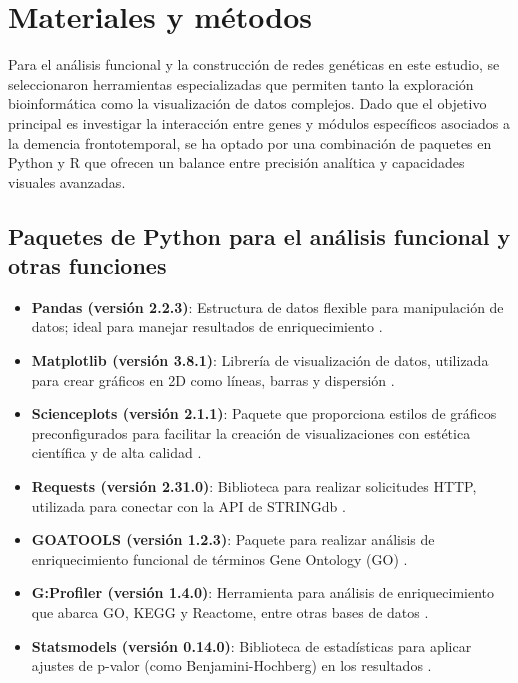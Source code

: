 \section{Materiales y métodos}
	
Para el análisis funcional y la construcción de redes genéticas en este estudio, se seleccionaron herramientas especializadas que permiten tanto la exploración bioinformática como la visualización de datos complejos. Dado que el objetivo principal es investigar la interacción entre genes y módulos específicos asociados a la demencia frontotemporal, se ha optado por una combinación de paquetes en Python y R que ofrecen un balance entre precisión analítica y capacidades visuales avanzadas.

\subsection*{Paquetes de Python para el análisis funcional y otras funciones}

\begin{itemize}
	\item \textbf{Pandas (versión 2.2.3)}: Estructura de datos flexible para manipulación de datos; ideal para manejar resultados de enriquecimiento \cite{pandas}.
	\item \textbf{Matplotlib (versión 3.8.1)}: Librería de visualización de datos, utilizada para crear gráficos en 2D como líneas, barras y dispersión \cite{matplotlib}.
	\item \textbf{Scienceplots (versión 2.1.1)}: Paquete que proporciona estilos de gráficos preconfigurados para facilitar la creación de visualizaciones con estética científica y de alta calidad \cite{scienceplots}.
	\item \textbf{Requests (versión 2.31.0)}: Biblioteca para realizar solicitudes HTTP, utilizada para conectar con la API de STRINGdb \cite{requests}.
	\item \textbf{GOATOOLS (versión 1.2.3)}: Paquete para realizar análisis de enriquecimiento funcional de términos Gene Ontology (GO) \cite{goatools}.
	\item \textbf{G:Profiler (versión 1.4.0)}: Herramienta para análisis de enriquecimiento que abarca GO, KEGG y Reactome, entre otras bases de datos \cite{gprofiler}.
	\item \textbf{Statsmodels (versión 0.14.0)}: Biblioteca de estadísticas para aplicar ajustes de p-valor (como Benjamini-Hochberg) en los resultados \cite{statsmodels}.
\end{itemize}

